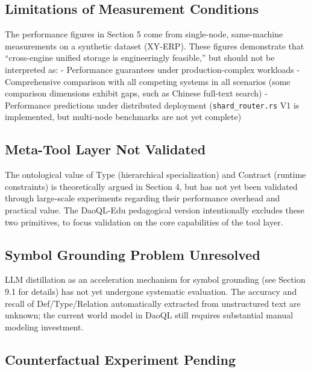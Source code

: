 \documentclass[11pt,a4paper]{article}
\begin{document}
\subsection{Limitations of Measurement
Conditions}\label{limitations-of-measurement-conditions}

The performance figures in Section 5 come from single-node, same-machine
measurements on a synthetic dataset (XY-ERP). These figures demonstrate
that ``cross-engine unified storage is engineeringly feasible,'' but
should not be interpreted as: - Performance guarantees under
production-complex workloads - Comprehensive comparison with all
competing systems in all scenarios (some comparison dimensions exhibit
gaps, such as Chinese full-text search) - Performance predictions under
distributed deployment (\texttt{shard\_router.rs} V1 is implemented, but
multi-node benchmarks are not yet complete)

\subsection{Meta-Tool Layer Not
Validated}\label{meta-tool-layer-not-validated}

The ontological value of Type (hierarchical specialization) and Contract
(runtime constraints) is theoretically argued in Section 4, but has not
yet been validated through large-scale experiments regarding their
performance overhead and practical value. The DaoQL-Edu pedagogical
version intentionally excludes these two primitives, to focus validation
on the core capabilities of the tool layer.

\subsection{Symbol Grounding Problem
Unresolved}\label{symbol-grounding-problem-unresolved}

LLM distillation as an acceleration mechanism for symbol grounding (see
Section 9.1 for details) has not yet undergone systematic evaluation.
The accuracy and recall of Def/Type/Relation automatically extracted
from unstructured text are unknown; the current world model in DaoQL
still requires substantial manual modeling investment.

\subsection{Counterfactual Experiment
Pending}\label{counterfactual-experiment-pending}
\end{document}

